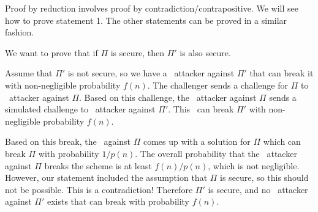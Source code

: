 \documentclass[11pt]{article}
\begin{document}
Proof by reduction involves proof by contradiction/contrapositive. We will see how to prove statement 1. The other statements can be proved in a similar fashion. 

We want to prove that if \(\Pi\) is secure, then \(\Pi'\) is also secure. 

\begin{prooof}
    Assume that \(\Pi'\) is not secure, so we have a \ppt\ attacker against \(\Pi'\) that can break it with non-negligible probability \(f(n)\). The challenger sends a challenge for \(\Pi\) to \ppt\ attacker against \(\Pi\).  Based on this challenge, the \ppt\ attacker against \(\Pi\) sends a simulated challenge to \ppt\ attacker against \(\Pi'\). This \ppt\ can break \(\Pi'\) with non-negligible probability \(f(n)\). 
    
    Based on this break, the \ppt\ against \(\Pi\) comes up with a solution for \(\Pi\) which can break \(\Pi\) with probability \(1/p(n)\). The overall probability that the \ppt\ attacker against \(\Pi\) breaks the scheme is at least \(f(n)/p(n)\), which is not negligible. However, our statement included the assumption that \(\Pi\) is secure, so this should not be possible. This is a contradiction! Therefore \(\Pi'\) is secure, and no \ppt\ attacker against \(\Pi'\) exists that can break with probability \(f(n)\).


\end{prooof}
\end{document}
